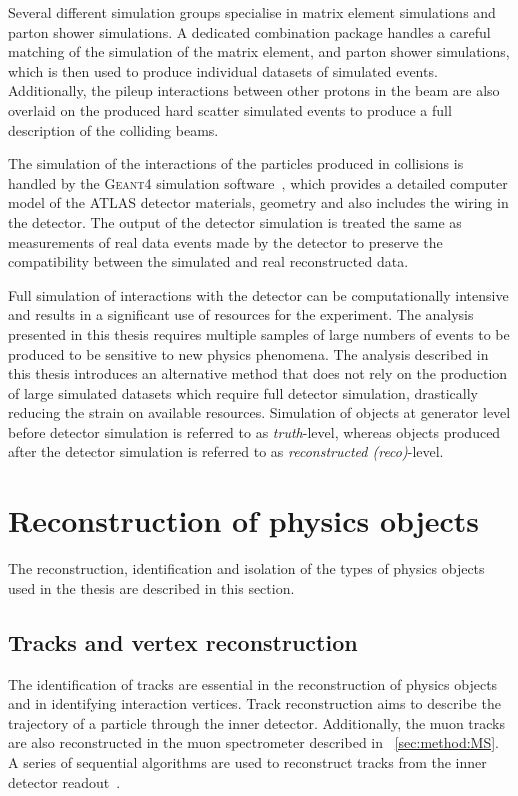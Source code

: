 Several different simulation groups specialise in matrix element simulations and parton shower simulations. A dedicated combination package handles a careful matching of the simulation of the matrix element, and parton shower simulations, which is then used to produce individual datasets of simulated events. Additionally, the pileup interactions between other protons in the beam are also overlaid on the produced hard scatter simulated events to produce a full description of the colliding beams. 

The simulation of the interactions of the particles produced in collisions is handled by the \textsc{Geant4} simulation software~\cite{Geant1,Geant2,Geant3}, which provides a detailed computer model of the ATLAS detector materials, geometry and also includes the wiring in the detector. The output of the detector simulation is treated the same as measurements of real data events made by the detector to preserve the compatibility between the simulated and real reconstructed data. 

Full simulation of interactions with the detector can be computationally intensive and results in a significant use of resources for the experiment. The analysis presented in this thesis requires multiple samples of large numbers of events to be produced to be sensitive to new physics phenomena. The analysis described in this thesis introduces an alternative method that does not rely on the production of large simulated datasets which require full detector simulation, drastically reducing the strain on available resources. Simulation of objects at generator level before detector simulation is referred to as \emph{truth}-level, whereas objects produced after the detector simulation is referred to as \emph{reconstructed (reco)}-level.

\section{Reconstruction of physics objects}\label{sec:reconstruction}
The reconstruction, identification and isolation of the types of physics objects used in the thesis are described in this section. 

\subsection{Tracks and vertex reconstruction}\label{sec:reconstruction:tracks}
The identification of tracks are essential in the reconstruction of physics objects and in identifying interaction vertices. Track reconstruction aims to describe the trajectory of a particle through the inner detector. Additionally, the muon tracks are also reconstructed in the muon spectrometer described in ~\cref{sec:method:MS}. A series of sequential algorithms are used to reconstruct tracks from the inner detector readout~\cite{ATLAS:tracking}. 

